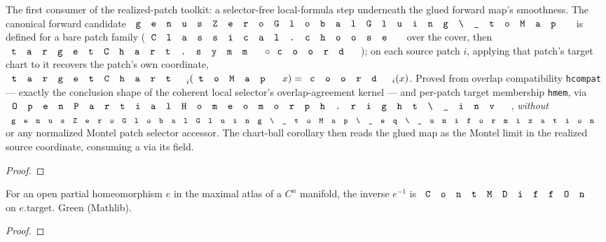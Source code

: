 \begin{lemma}
\label{lem:montel-glued-map-local-agreement}
The first consumer of the realized-patch toolkit: a selector-free local-formula
step underneath the glued forward map's smoothness. The canonical forward
candidate \(\code{genusZeroGlobalGluing\_toMap}\) is defined for a bare patch
family (\(\code{Classical.choose}\) over the cover, then
\(\code{targetChart.symm}\circ\code{coord}\)); on each source patch \(i\),
applying that patch's target chart to it recovers the patch's own coordinate,
\(\code{targetChart}_i(\code{toMap}\,x)=\code{coord}_i(x)\). Proved from overlap
compatibility \texttt{hcompat} — exactly the conclusion shape of the coherent
local selector's overlap-agreement kernel — and per-patch target membership
\texttt{hmem}, via \(\code{OpenPartialHomeomorph.right\_inv}\), \emph{without}
\(\code{genusZeroGlobalGluing\_toMap\_eq\_uniformization}\) or any normalized
Montel patch selector accessor. The chart-ball corollary then reads the glued
map as the Montel limit in the realized source coordinate, consuming a
 via its  field.
\leanok
\end{lemma}
\begin{proof}\leanok\end{proof}

\begin{lemma}
\label{lem:mathlib-contmdiffon-symm-of-mem-maximalatlas}
For an open partial homeomorphism \(e\) in the maximal atlas of a \(C^n\)
manifold, the inverse \(e^{-1}\) is \(\code{ContMDiffOn}\) on \(e.\mathrm{target}\).
Green (Mathlib).
\leanok
\end{lemma}
\begin{proof}\leanok\end{proof}


